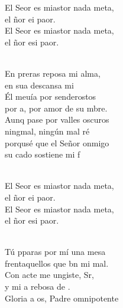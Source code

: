 \documentclass[12pt]{article}
\begin{document}
\begin{multicols*}{2}
\begin{cancion}%
	\begin{chorus}%
	El Seor es miastor nada meta,\\
	el ñor ei paor.\\
	El Seor es miastor nada meta,\\
	el ñor esi paor.\\
	\end{chorus}%
	\jump\\
	En preras reposa mi alma,\\
	en sua descansa mi \\
	Él meuía por senderostos\\
	por a, por amor de su mbre.\\
	Aunq pase por valles oscuros\\
	ningmal, ningún mal ré\\
	porqusé que el Señor onmigo\\
	su cado sostiene mi f\\\jump\\
	\begin{chorus}%
	El Seor es miastor nada meta,\\
	el ñor ei paor.\\
	El Seor es miastor nada meta,\\
	el ñor esi paor.\\
	\end{chorus}%
	\jump\\
	Tú pparas por mí una mesa\\
	frentaquellos que bn mi mal.\\
	Con acte me ungiste, Sr,\\
	y mi a rebosa de .\\
	Gloria a os, Padre omnipotente\\

\end{cancion}
\end{multicols*}
\end{document}
